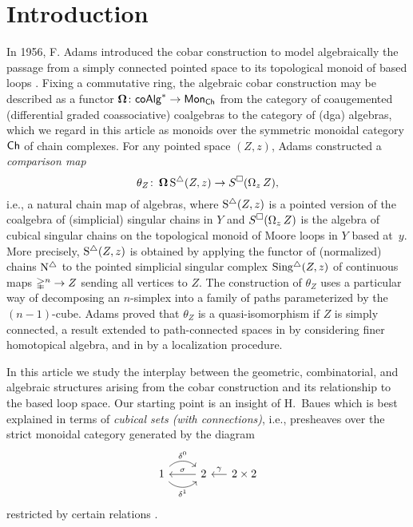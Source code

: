 
\section{Introduction}

In 1956, F. Adams introduced the cobar construction to model algebraically the passage from a simply connected pointed space to its topological monoid of based loops \cite{adams1956cobar}.
Fixing a commutative ring, the algebraic cobar construction may be described as a functor $\operatorname{\mathbf{\Omega}} \colon \mathsf{coAlg}^\ast \to \mathsf{Mon}_{\mathsf{Ch}}$ from the category of coaugemented  (differential graded coassociative) coalgebras to the category of (dga) algebras, which we regard in this article as monoids over the symmetric monoidal category $\mathsf{Ch}$ of chain complexes.
For any pointed space $(Z, z)$, Adams constructed a \textit{comparison map}
\begin{equation} \label{e:adams map}
\theta_Z \colon \operatorname{\mathbf{\Omega}} \operatorname{S^{\triangle}}(Z, z) \to S^{\square}(\operatorname{\Omega}_z Z),
\end{equation}
i.e., a natural chain map of algebras, where $\operatorname{S^{\triangle}}(Z,z)$ is a pointed version of the coalgebra of (simplicial) singular chains in $Y$ and $S^{\square}(\operatorname{\Omega}_zZ)$ is the algebra of cubical singular chains on the topological monoid of Moore loops in $Y$ based at~$y$.
More precisely, $\operatorname{S^{\triangle}}(Z,z)$ is obtained by applying the functor of (normalized) chains $\operatorname{N^{\triangle}}$ to the pointed simplicial singular complex $\operatorname{Sing^{\triangle}}(Z, z)$ of continuous maps $\mathbb{\Delta}^n \to Z$ sending all vertices to $Z$. The construction of  $\theta_Z$ uses a particular way of decomposing an $n$-simplex into a family of paths parameterized by the $(n-1)$-cube. Adams proved that $\theta_Z$ is a quasi-isomorphism if $Z$ is simply connected, a result extended to path-connected spaces in \cite{rivera2018cubical} by considering finer homotopical algebra, and in \cite{hess2010cobar} by a localization procedure.

In this article we study the interplay between the geometric, combinatorial, and algebraic structures arising from the cobar construction and its relationship to the based loop space.
Our starting point is an insight of H.~Baues which is best explained in terms of \textit{cubical sets (with connections)}, i.e., presheaves over the 
strict monoidal category generated by the diagram
\[
\begin{tikzcd}
1 \arrow[r, out=45, in=135, "\delta^0"] \arrow[r, out=-45, in=-135, "\delta^1"'] & 2 \arrow[l, "\sigma"'] &[-10pt] \arrow[l, "\gamma"'] 2 \times 2
\end{tikzcd}
\]
restricted by certain relations \cite{brown1981cubes, grandis2003cubical}.


